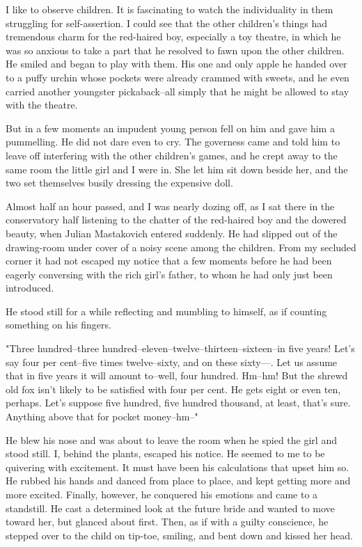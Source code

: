 I like to observe children. It is fascinating to watch the
individuality in them struggling for self-assertion. I could see that
the other children's things had tremendous charm for the red-haired
boy, especially a toy theatre, in which he was so anxious to take a
part that he resolved to fawn upon the other children. He smiled and
began to play with them. His one and only apple he handed over to a
puffy urchin whose pockets were already crammed with sweets, and he
even carried another youngster pickaback--all simply that he might be
allowed to stay with the theatre.

But in a few moments an impudent young person fell on him and gave him
a pummelling. He did not dare even to cry. The governess came and told
him to leave off interfering with the other children's games, and he
crept away to the same room the little girl and I were in. She let him
sit down beside her, and the two set themselves busily dressing the
expensive doll.

Almost half an hour passed, and I was nearly dozing off, as I sat
there in the conservatory half listening to the chatter of the
red-haired boy and the dowered beauty, when Julian Mastakovich entered
suddenly. He had slipped out of the drawing-room under cover of a
noisy scene among the children. From my secluded corner it had not
escaped my notice that a few moments before he had been eagerly
conversing with the rich girl's father, to whom he had only just been
introduced.

He stood still for a while reflecting and mumbling to himself, as if
counting something on his fingers.

"Three hundred--three hundred--eleven--twelve--thirteen--sixteen--in
five years! Let's say four per cent--five times twelve--sixty, and on
these sixty---. Let us assume that in five years it will amount
to--well, four hundred. Hm--hm! But the shrewd old fox isn't likely to
be satisfied with four per cent. He gets eight or even ten, perhaps.
Let's suppose five hundred, five hundred thousand, at least, that's
sure. Anything above that for pocket money--hm--"

He blew his nose and was about to leave the room when he spied the
girl and stood still. I, behind the plants, escaped his notice. He
seemed to me to be quivering with excitement. It must have been his
calculations that upset him so. He rubbed his hands and danced from
place to place, and kept getting more and more excited. Finally,
however, he conquered his emotions and came to a standstill. He cast a
determined look at the future bride and wanted to move toward her, but
glanced about first. Then, as if with a guilty conscience, he stepped
over to the child on tip-toe, smiling, and bent down and kissed her
head.

